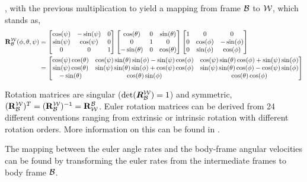 \noindent, with the previous multiplication to yield a mapping from frame $\mathcal{B}$ to $\mathcal{W}$, which stands as,
\begin{equation}
	\begin{aligned}
	\mathbf{R}_{\mathcal{B}}^{\mathcal{W}} (\phi, \theta, \psi) &=
	\begin{bmatrix}
		\cos(\psi) & -\sin(\psi) & 0 \\
		\sin(\psi) & \cos(\psi) & 0 \\
		0 & 0 & 1
	\end{bmatrix}
	\begin{bmatrix}
		\cos(\theta) & 0 & \sin(\theta) \\
		0 & 1 & 0 \\
		-\sin(\theta) & 0 & \cos(\theta)
	\end{bmatrix}
	\begin{bmatrix}
		1 & 0 & 0 \\
		0 & \cos(\phi) & -\sin(\phi) \\
		0 & \sin(\phi) & \cos(\phi)
	\end{bmatrix} \\
	& =
	\begin{bmatrix} 
		\cos(\psi) \cos(\theta) & \cos(\psi) \sin(\theta) \sin(\phi) - \sin(\psi) \cos(\phi) & \cos(\psi) \sin(\theta) \cos(\phi) + \sin(\psi) \sin(\phi) \\
		\sin(\psi) \cos(\theta) & \sin(\psi) \sin(\theta) \sin(\phi) + \cos(\psi) \cos(\phi) & \sin(\psi) \sin(\theta) \cos(\phi) - \cos(\psi) \sin(\phi) \\
		-\sin(\theta) & \cos(\theta) \sin(\phi) & \cos(\theta) \cos(\phi)
	\end{bmatrix}
	\end{aligned}
	\label{eq:rotationMatrixW2B}
\end{equation}

Rotation matrices are singular ($\det(\bm{\RotMatrix}_{\BodyFrame}^{\WorldFrame}) = 1$) and symmetric, $(\mathbf{R}_{\mathcal{B}}^{\mathcal{W}})^T = (\mathbf{R}_{\mathcal{B}}^{\mathcal{W}})^{-1} = \mathbf{R}_{\mathcal{W}}^{\mathcal{B}}$. Euler rotation matrices can be derived from 24 different conventions ranging from extrinsic or intrinsic rotation with different rotation orders. More information on this can be found in \cite{Roithmayr2015}.

The mapping between the euler angle rates and the body-frame angular velocities can be found by transforming the euler rates from the intermediate frames to body frame $\mathcal{B}$.


